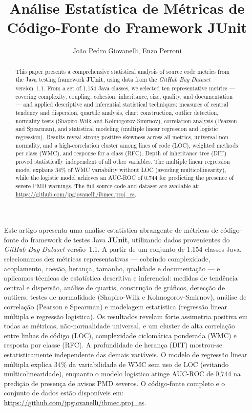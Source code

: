 \documentclass[12pt]{article}
\title{Análise Estatística de Métricas de Código-Fonte do Framework JUnit}
\author{
  João Pedro Giovanelli\inst{1},
  Enzo Perroni\inst{1}
}
\begin{document}
\maketitle

\begin{abstract}
This paper presents a comprehensive statistical analysis of source code
metrics from the Java testing framework \textbf{JUnit}, using data from
the \textit{GitHub Bug Dataset} version~1.1. From a set of 1,154 Java
classes, we selected ten representative metrics — covering complexity,
coupling, cohesion, inheritance, size, quality, and documentation — and
applied descriptive and inferential statistical techniques: measures of
central tendency and dispersion, quartile analysis, chart construction,
outlier detection, normality tests (Shapiro-Wilk and Kolmogorov-Smirnov),
correlation analysis (Pearson and Spearman), and statistical modeling
(multiple linear regression and logistic regression). Results reveal
strong positive skewness across all metrics, universal non-normality, and
a high-correlation cluster among lines of code (LOC), weighted methods per
class (WMC), and response for a class (RFC). Depth of inheritance tree
(DIT) proved statistically independent of all other variables. The multiple
linear regression model explains 34\% of WMC variability without LOC
(avoiding multicollinearity), while the logistic model achieves an
AUC-ROC of 0.744 for predicting the presence of severe PMD warnings. The
full source code and dataset are available at:
\url{https://github.com/jpgiovanelli/ibmec.proj_es}.
\end{abstract}

\begin{resumo}
Este artigo apresenta uma análise estatística abrangente de métricas de
código-fonte do framework de testes Java \textbf{JUnit}, utilizando dados
provenientes do \textit{GitHub Bug Dataset} versão~1.1. A partir de um
conjunto de 1.154 classes Java, selecionamos dez métricas representativas
— cobrindo complexidade, acoplamento, coesão, herança, tamanho, qualidade
e documentação — e aplicamos técnicas de estatística descritiva e
inferencial: medidas de tendência central e dispersão, análise de quartis,
construção de gráficos, detecção de outliers, testes de normalidade
(Shapiro-Wilk e Kolmogorov-Smirnov), análise de correlação (Pearson e
Spearman) e modelagem estatística (regressão linear múltipla e regressão
logística). Os resultados revelam forte assimetria positiva em todas as
métricas, não-normalidade universal, e um cluster de alta correlação entre
linhas de código (LOC), complexidade ciclomática ponderada (WMC) e resposta
por classe (RFC). A profundidade de herança (DIT) mostrou-se
estatisticamente independente das demais variáveis. O modelo de regressão
linear múltipla explica 34\% da variabilidade de WMC sem uso de LOC
(evitando multicolinearidade), enquanto o modelo logístico atinge
AUC-ROC de 0,744 na predição de presença de avisos PMD severos. O
código-fonte completo e o conjunto de dados estão disponíveis em:
\url{https://github.com/jpgiovanelli/ibmec.proj_es}.
\end{resumo}
\end{document}
